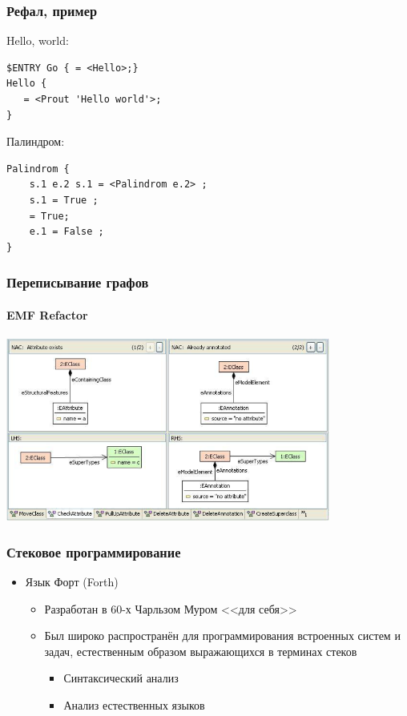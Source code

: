 \documentclass{../../slides-style}
\begin{document}
    \begin{frame}[fragile]
        \frametitle{Рефал, пример}
        Hello, world:
        \begin{verbatim}
$ENTRY Go { = <Hello>;}
Hello {
   = <Prout 'Hello world'>;
}
        \end{verbatim}
        \vspace{3mm}
        Палиндром:
        \begin{verbatim}
Palindrom {
    s.1 e.2 s.1 = <Palindrom e.2> ;
    s.1 = True ;
    = True;
    e.1 = False ;
}
        \end{verbatim}
    \end{frame}
    
    \begin{frame}
        \frametitle{Переписывание графов}
        \framesubtitle{EMF Refactor}
        \begin{center}
            \includegraphics[width=0.8\textwidth]{graphRewriting.png}
        \end{center}
    \end{frame}

    \begin{frame}
        \frametitle{Стековое программирование}
        \begin{itemize}
            \item Язык Форт (Forth)
            \begin{itemize}
                \item Разработан в 60-х Чарльзом Муром <<для себя>>
                \item Был широко распространён для программирования встроенных систем и задач, естественным образом выражающихся в терминах стеков
                \begin{itemize}
                    \item Синтаксический анализ
                    \item Анализ естественных языков
                \end{itemize}
            \end{itemize}
        \end{itemize}
    \end{frame}
\end{document}
